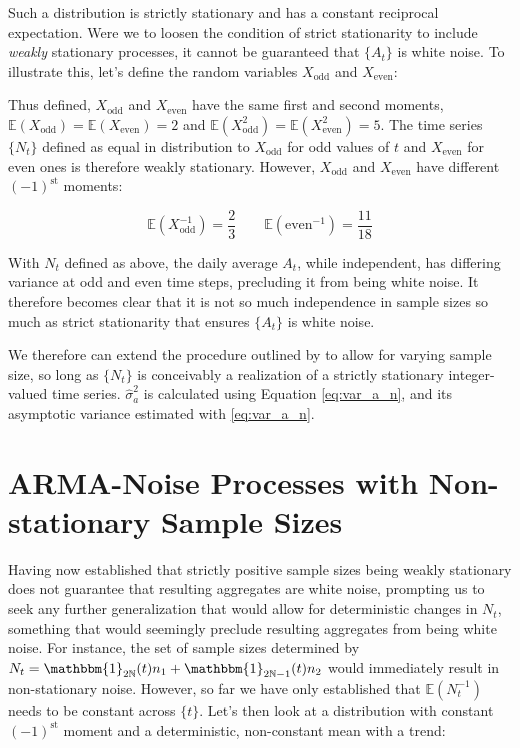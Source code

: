 Such a distribution is strictly stationary and has a constant reciprocal expectation. Were we to loosen the condition of strict stationarity to include \emph{weakly} stationary processes, it cannot be guaranteed that $\{A_t\}$ is white noise. To illustrate this, let's define the random variables $X_\text{odd}$ and $X_\text{even}$:



Thus defined, $X_\text{odd}$ and $X_\text{even}$ have the same first and second moments, $\mathbb{E}(X_\text{odd}) = \mathbb{E}(X_\text{even}) = 2$ and $\mathbb{E}(X_\text{odd}^2) = \mathbb{E}(X_\text{even}^2) = 5$. The time series $\{N_t\}$ defined as equal in distribution to $X_\text{odd}$ for odd values of $t$ and $X_\text{even}$ for even ones is therefore weakly stationary. However, $X_\text{odd}$ and $X_\text{even}$ have different $(-1)^\text{st}$ moments:

$$ \mathbb{E}(X_\text{odd}^{-1}) = \frac{2}{3}\qquad \mathbb{E}(\text{even}^{-1}) = \frac{11}{18} $$

With $N_t$ defined as above, the daily average $A_t$, while independent, has differing variance at odd and even time steps, precluding it from being white noise. It therefore becomes clear that it is not so much independence in sample sizes so much as strict stationarity that ensures $\{A_t\}$ is white noise.


We therefore can extend the procedure outlined by \citep{WongMiller1990} to allow for varying sample size, so long as $\{N_t\}$ is conceivably a realization of a strictly stationary integer-valued time series. $\hat{\sigma}_a^2$ is calculated using Equation \ref{eq:var_a_n}, and its asymptotic variance estimated with \ref{eq:var_a_n}.

\section{ARMA-Noise Processes with Non-stationary Sample Sizes}

Having now established that strictly positive sample sizes being weakly stationary does not guarantee that resulting aggregates are white noise, prompting us to seek any further generalization that would allow for  deterministic changes in $N_t$, something that would seemingly preclude resulting aggregates from being white noise. For instance, the set of sample sizes determined by $N_t = \mathbbm{1}_{2\mathbb{N}}(t)n_1 + \mathbbm{1}_{2\mathbb{N}-1}(t)n_2$ would immediately result in non-stationary noise. However, so far we have only established that $\mathbb{E}(N_t^{-1})$ needs to be constant across $\{t\}$. Let's then look at a distribution with constant $(-1)^\text{st}$ moment and a deterministic, non-constant mean with a trend:

